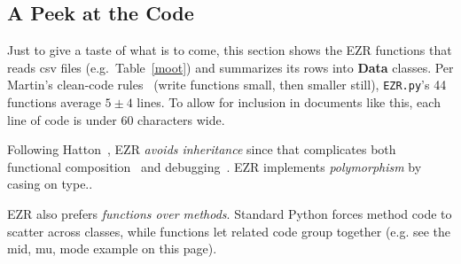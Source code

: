 \documentclass[AMA,STIX2COL]{WileyNJDv5}
\newcommand{\cls}[1]{%
  \setlength{\fboxsep}{1.5pt}%
  \colorbox{clsbg}{\sffamily\bfseries{#1}}%
}
\begin{document}



\subsection{A Peek at the Code}
Just to give a taste of what is to come,   this section 
shows the EZR functions that reads csv files (e.g.\ Table~\ref{moot}) and summarizes its \textsf{rows} into \cls{Data} classes.  Per Martin's clean-code rules~\cite{martin2009clean} (write functions small, then smaller still), \texttt{EZR.py}'s  44 functions   average $5{\pm}4$
lines. To allow for inclusion in documents like this, each line of code
is under   60 characters wide. 

Following Hatton~\cite{Hatton:1998}, EZR {\em avoids inheritance} since that complicates both  functional composition~\cite{GoF:1995} and debugging~\cite{hatton1998oo}. EZR  implements {\em polymorphism} by  casing 
on type.. 

EZR also prefers {\em functions over methods}. Standard Python forces method code to scatter across classes, while functions let related code group together (e.g. see the  \textsf{mid, mu, mode} example on this page). 
\end{document}

